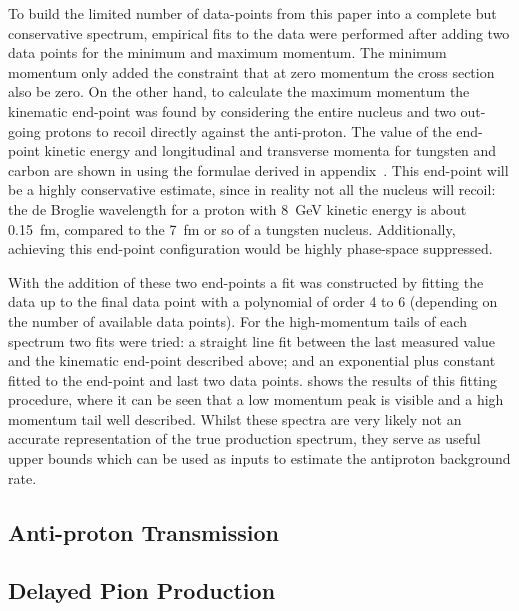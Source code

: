 To build the limited number of data-points from this paper into a complete but conservative spectrum, empirical fits to the data were performed after adding two data points for the minimum and maximum momentum.
The minimum momentum only added the constraint that at zero momentum the cross section also be zero.
On the other hand, to calculate the maximum momentum the kinematic end-point was found by considering the entire nucleus and two out-going protons to recoil directly against the anti-proton.
The value of the end-point kinetic energy and longitudinal and transverse momenta for tungsten and carbon are shown in  using the formulae derived in appendix~.
This end-point will be a highly conservative estimate, since in reality not all the nucleus will recoil:  the de Broglie wavelength for a proton with 8~GeV kinetic energy is about 0.15~fm, compared to the 7~fm or so of a tungsten nucleus.
Additionally, achieving this end-point configuration would be highly phase-space suppressed.

With the addition of these two end-points a fit was constructed by fitting the data up to the final data point with a polynomial of order 4 to 6 (depending on the number of available data points).
For the high-momentum tails of each spectrum two fits were tried: a straight line fit between the last measured value and the kinematic end-point described above; and an exponential plus constant fitted to the end-point and last two data points.  
 shows the results of this fitting procedure, where it can be seen that a low momentum peak is visible and a high momentum tail well described.
Whilst these spectra are very likely not an accurate representation of the true production spectrum, they serve as useful upper bounds which can be used as inputs to estimate the antiproton background rate.


\subsection{Anti-proton Transmission}
\subsection{Delayed Pion Production}
